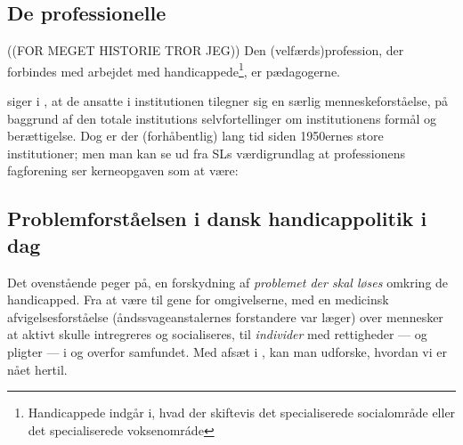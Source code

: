 \subsection{De professionelle}
((FOR MEGET HISTORIE TROR JEG))
Den (velfærds)profession, der forbindes med arbejdet med handicappede\footnote{Handicappede indgår i, hvad der skiftevis det specialiserede socialområde eller det specialiserede voksenomráde}, er pædagogerne.

\citeauthor{goffmanAsylumsEssaysSocial1991} siger i , at de ansatte  i institutionen tilegner sig en særlig menneskeforståelse, på baggrund af den totale institutions selvfortellinger om institutionens formål og berættigelse.
Dog er der (forhåbentlig) lang tid siden 1950ernes store institutioner; men man kan se ud fra SLs værdigrundlag at professionens fagforening ser kerneopgaven som at være:

\subsection{Problemforståelsen i dansk handicappolitik i dag}
Det ovenstående peger på, en forskydning af \textit{problemet der skal løses} omkring de handicapped.
Fra at være til gene for omgivelserne, med en medicinsk afvigelsesforståelse (åndssvageanstalernes forstandere var læger) over mennesker at aktivt skulle intregreres og socialiseres, til \textit{individer} med rettigheder — og pligter — i og overfor samfundet.
Med afsæt i \citeauthor{scheurichPolicyArchaeologyNew1994}, kan man udforske, hvordan vi er nået hertil.
